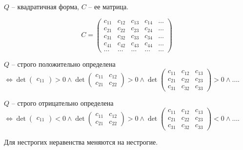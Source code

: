 \begin{theorem} \thmslashn

	$Q$ -- квадратичная форма, $C$ -- ее матрица.
	
	\[
	C = \begin{pmatrix}
	c_{11}&c_{12}&c_{13}&c_{14}&\dots\\
	c_{21}&c_{22}&c_{23}&c_{24}&\dots\\
	c_{31}&c_{32}&c_{33}&c_{34}&\dots\\
	c_{41}&c_{42}&c_{43}&c_{44}&\dots\\
	\dots&\dots&\dots&\dots&\dots
	\end{pmatrix}
	\]
	
	$Q$ -- строго положительно определена $\Leftrightarrow \det \begin{pmatrix} c_{11} \end{pmatrix} > 0 \wedge \det \begin{pmatrix}
	c_{11}&c_{12}\\
	c_{21}&c_{22}
	\end{pmatrix} > 0 \wedge \det \begin{pmatrix}
	c_{11}&c_{12}&c_{13}\\
	c_{21}&c_{22}&c_{23}\\
	c_{31}&c_{32}&c_{33}
	\end{pmatrix} > 0 \wedge \dots$.
	
	$Q$ -- строго отрицательно определена $\Leftrightarrow \det \begin{pmatrix} c_{11} \end{pmatrix} < 0 \wedge \det \begin{pmatrix}
	c_{11}&c_{12}\\
	c_{21}&c_{22}
	\end{pmatrix} > 0 \wedge \det \begin{pmatrix}
	c_{11}&c_{12}&c_{13}\\
	c_{21}&c_{22}&c_{23}\\
	c_{31}&c_{32}&c_{33}
	\end{pmatrix} < 0 \wedge \dots$.
	
	Для нестрогих неравенства меняются на нестрогие.
\end{theorem}